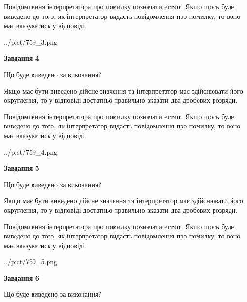 \documentclass[12pt, ukrainian]{article}
\begin{document}
{\begin {Large}
Повідомлення інтерпретатора про помилку позначати \textbf{error}.
Якщо щось буде виведено до того, як інтерпретатор видасть повідомлення про помилку, 
то воно має вказуватись у відповіді. \par

\begin{center}
	{../pict/759_3.png}
\end{center}
\newpage

{\begin {center}\textbf{Завдання 4}\end {center}}\par
Що буде виведено за виконання? \par

Якщо має бути виведено дійсне значення та інтерпретатор має здійснювати його округлення, 
то у відповіді достатньо правильно вказати два дробових розряди.

Повідомлення інтерпретатора про помилку позначати \textbf{error}.
Якщо щось буде виведено до того, як інтерпретатор видасть повідомлення про помилку, 
то воно має вказуватись у відповіді. \par

\begin{center}
	{../pict/759_4.png}
\end{center}
\newpage

{\begin {center}\textbf{Завдання 5}\end {center}}\par
Що буде виведено за виконання? \par

Якщо має бути виведено дійсне значення та інтерпретатор має здійснювати його округлення, 
то у відповіді достатньо правильно вказати два дробових розряди.

Повідомлення інтерпретатора про помилку позначати \textbf{error}.
Якщо щось буде виведено до того, як інтерпретатор видасть повідомлення про помилку, 
то воно має вказуватись у відповіді. \par

\begin{center}
	{../pict/759_5.png}
\end{center}
\newpage

{\begin {center}\textbf{Завдання 6}\end {center}}\par
Що буде виведено за виконання? \par


\end{Large}}
\end{document}
